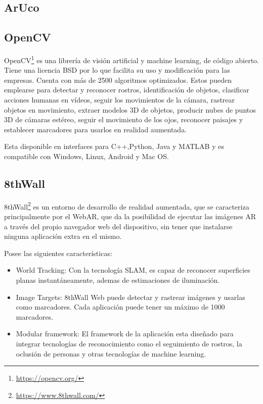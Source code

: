 \subsection{ArUco}


\subsection{OpenCV}
OpenCV\footnote{\url{https://opencv.org/}} es una librería de visión artificial y machine learning, de código abierto. Tiene una licencia BSD por lo que facilita su uso y modificación para las empresas. Cuenta con más de 2500 algoritmos optimizados. Estos pueden emplearse para detectar y reconocer rostros, identificación de objetos, clasificar acciones humanas en vídeos, seguir los movimientos de la cámara, rastrear objetos en movimiento, extraer modelos 3D de objetos, producir nubes de puntos 3D de cámaras estéreo, seguir el movimiento de los ojos, reconocer paisajes y establecer marcadores para usarlos en realidad aumentada.

Esta disponible en interfaces para C++,Python, Java y MATLAB y es compatible con Windows, Linux, Android y Mac OS.


\subsection{8thWall}
8thWall\footnote{\url{https://www.8thwall.com/}}
es un entorno de desarrollo de realidad aumentada, que se caracteriza principalmente por el WebAR, que da la posibilidad de ejecutar las imágenes AR a través del propio navegador web del dispositivo, sin tener que instalarse ninguna aplicación extra en el mismo\cite{8thwall_products}.

Posee las siguientes características:
\begin{itemize}
	\item World Tracking: Con la tecnología SLAM, es capaz de reconocer superficies planas instantáneamente, ademas de estimaciones de iluminación.
	\item Image Targets: 8thWall Web puede detectar y rastrear imágenes y usarlas como marcadores. Cada aplicación puede tener un máximo de 1000 marcadores.
	\item Modular framework: El framework de la aplicación esta diseñado para integrar tecnologías de reconocimiento como el seguimiento de rostros, la oclusión de personas y otras tecnologías de machine learning.
\end{itemize}


